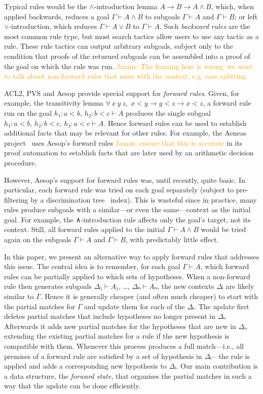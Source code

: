 \documentclass[runningheads]{llncs}
\newcommand{\jcom}[1]{{\textcolor{orange}{Jannis: #1}} }
\newcommand{\All}[2]{\ensuremath{\forall\, #1,\; #2}}
\begin{document}
Typical rules would be the $∧$-introduction lemma $A → B → A ∧ B$, which, when applied backwards, reduces a goal $Γ ⊢ A ∧ B$ to subgoals $Γ ⊢ A$ and $Γ ⊢ B$; or left $∨$-introduction, which reduces $Γ ⊢ A ∨ B$ to $Γ ⊢ A$.
Such \emph{backward rules} are the most common rule type, but most search tactics allow users to use any tactic as a rule.
These rule tactics can output arbitrary subgoals, subject only to the condition that proofs of the returned subgoals can be assembled into a proof of the goal on which the rule was run.
\jcom{The framing here is wrong: we want to talk about non-forward rules that mess with the context, e.g. case splitting.}

ACL2, PVS and Aesop provide special support for \emph{forward rules}.
Given, for example, the transitivity lemma $\All{x~y~z}{x < y → y < z → x < z}$, a forward rule run on the goal $h₁ : a < b,\, h₂ : b < c ⊢ A$ produces the single subgoal $h₁ : a < b,\, h₂ : b < c,\, h₃ : a < c ⊢ A$.
Hence forward rules can be used to establish additional facts that may be relevant for other rules.
For example, the Aeneas project~\cite{Aeneas} uses Aesop's forward rules \jcom{ensure that this is accurate} in its proof automation to establish facts that are later used by an arithmetic decision procedure.

However, Aesop's support for forward rules was, until recently, quite basic.
In particular, each forward rule was tried on each goal separately (subject to pre-filtering by a discrimination tree~\cite{DiscriminationTrees} index).
This is wasteful since in practice, many rules produce subgoals with a similar---or even the same---context as the initial goal.
For example, the ∧-introduction rule affects only the goal's target, not its context.
Still, all forward rules applied to the initial $Γ ⊢ A ∧ B$ would be tried again on the subgoals $Γ ⊢ A$ and $Γ ⊢ B$, with predictably little effect.

In this paper, we present an alternative way to apply forward rules that addresses this issue.
The central idea is to remember, for each goal $Γ ⊢ A$, which forward rules can be partially applied to which sets of hypotheses.
When a non-forward rule then generates subgoals $Δ₁ ⊢ A₁$, \dots, $Δₙ ⊢ Aₙ$, the new contexts $Δᵢ$ are likely similar to $Γ$.
Hence it is generally cheaper (and often much cheaper) to start with the partial matches for $Γ$ and update them for each of the $Δᵢ$.
The update first deletes partial matches that include hypotheses no longer present in $Δᵢ$.
Afterwards it adds new partial matches for the hypotheses that are new in $Δᵢ$, extending the existing partial matches for a rule if the new hypothesis is compatible with them.
Whenever this process produces a full match---i.e., all premises of a forward rule are satisfied by a set of hypothesis in $Δᵢ$---the rule is applied and adds a corresponding new hypothesis to $Δᵢ$.
Our main contribution is a data structure, the \emph{forward state}, that organises the partial matches in such a way that the update can be done efficiently.
\end{document}
